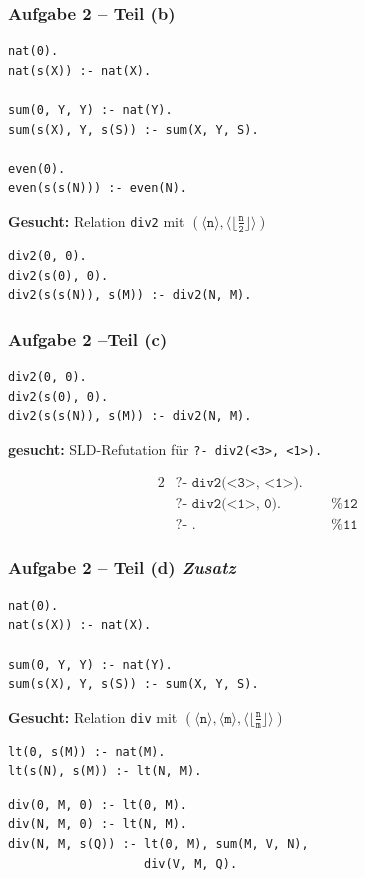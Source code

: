 \documentclass{beamer}
\newcommand{\num}[1]{\ensuremath{\langle #1 \rangle}}
\begin{document}
\begin{frame}[fragile] \frametitle{Aufgabe 2 -- Teil (b)}
	\footnotesize
	\begin{lstlisting}
nat(0).
nat(s(X)) :- nat(X).

sum(0, Y, Y) :- nat(Y).
sum(s(X), Y, s(S)) :- sum(X, Y, S).

even(0).
even(s(s(N))) :- even(N).
	\end{lstlisting}
	
	\textbf{Gesucht:} Relation \texttt{div2} mit $(\num{\texttt{n}} , \num{\lfloor \frac{\texttt{n}}{\texttt{2}} \rfloor})$
	
	\pause
	
	\begin{lstlisting}[firstnumber=10]
div2(0, 0).
div2(s(0), 0).
div2(s(s(N)), s(M)) :- div2(N, M).
	\end{lstlisting}
\end{frame}

\begin{frame}[fragile] \frametitle{Aufgabe 2 --Teil (c)}
	\begin{lstlisting}[firstnumber=10]
div2(0, 0).
div2(s(0), 0).
div2(s(s(N)), s(M)) :- div2(N, M).
	\end{lstlisting}

	\textbf{gesucht:} SLD-Refutation für \texttt{?- div2(<3>, <1>).}
	
	\begin{alignat*}{2}
		&\texttt{?- div2(<3>, <1>).} \\
		&\texttt{?- div2(<1>, 0).} \qquad && \texttt{\% 12 } \\
		&\texttt{?- .} && \texttt{\% 11 }
	\end{alignat*}
\end{frame}

\begin{frame}[fragile] \frametitle{Aufgabe 2 -- Teil (d) \hfill \textit{Zusatz}}
	\footnotesize
	\begin{lstlisting}
nat(0).
nat(s(X)) :- nat(X).

sum(0, Y, Y) :- nat(Y).
sum(s(X), Y, s(S)) :- sum(X, Y, S).
	\end{lstlisting}
	
	\textbf{Gesucht:} Relation \texttt{div} mit $(\num{\texttt{n}} , \num{\texttt{m}} , \num{\lfloor \frac{\texttt{n}}{\texttt{m}} \rfloor})$
	
	\pause
	
	\begin{lstlisting}[firstnumber=14]
lt(0, s(M)) :- nat(M).
lt(s(N), s(M)) :- lt(N, M).
	\end{lstlisting}
	
	\pause
	
	\begin{lstlisting}[firstnumber=17]
div(0, M, 0) :- lt(0, M).
div(N, M, 0) :- lt(N, M).
div(N, M, s(Q)) :- lt(0, M), sum(M, V, N), 
                   div(V, M, Q).
	\end{lstlisting}
\end{frame}
\end{document}

